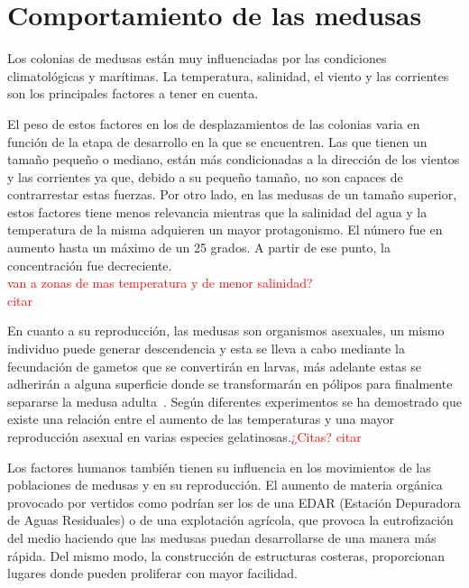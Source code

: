 


\section{Comportamiento de las medusas}
Los colonias de medusas están muy influenciadas por las condiciones climatológicas y marítimas. La temperatura, salinidad, el viento y las corrientes son los principales factores a tener en cuenta.

El peso de estos factores en los de desplazamientos de las colonias varia en función de la etapa de desarrollo en la que se encuentren. Las que tienen un tamaño pequeño o mediano, están más condicionadas a la dirección de los vientos y las corrientes ya que, debido a su pequeño tamaño, no son capaces de contrarrestar estas fuerzas. Por otro lado, en las medusas de un tamaño superior, estos factores tiene menos relevancia mientras que la salinidad del agua y la temperatura de la misma adquieren un mayor protagonismo. El número fue en aumento hasta un máximo de un 25 grados. A partir de ese punto, la concentración fue decreciente.\\
\textcolor{red}{van a zonas de mas temperatura y de menor salinidad?}\\
\textcolor{red}{citar}

En cuanto a su reproducción, las medusas son organismos asexuales, un mismo individuo puede generar descendencia y esta se lleva a cabo mediante la fecundación de gametos que se convertirán en larvas, más adelante estas se adherirán a alguna superficie donde se transformarán en pólipos para finalmente separarse la medusa adulta~\cite{noauthor_reproduccion_2016}. Según diferentes experimentos se ha demostrado que existe una relación entre el aumento de las temperaturas y una mayor reproducción asexual en varias especies gelatinosas.\textcolor{red}{¿Citas?}
\textcolor{red}{citar}

Los factores humanos también tienen su influencia en los movimientos de las poblaciones de medusas y en su reproducción. 
El aumento de materia orgánica provocado por vertidos como podrían ser los de una EDAR (Estación Depuradora de Aguas Residuales) o de una explotación agrícola, que provoca la eutrofización del medio haciendo que las medusas puedan desarrollarse de una manera más rápida. Del mismo modo, la construcción de estructuras costeras, proporcionan lugares donde pueden proliferar con mayor facilidad.

